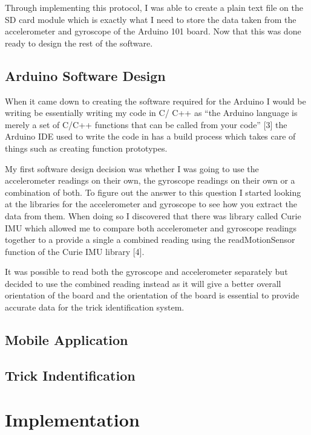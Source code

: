 Through implementing this protocol, I was able to create a plain text file on the SD card module which is exactly what I need to store the data taken from the accelerometer and gyroscope of the Arduino 101 board. Now that this was done ready to design the rest of the software.

\subsection{Arduino Software Design}\label{arduinosoftwaredesign}

When it came down to creating the software required for the Arduino I would be writing be essentially writing my code in C/ C++ as “the Arduino language is merely a set of C/C++ functions that can be called from your code” [3] the Arduino IDE used to write the code in has a build process which takes care of things such as creating function prototypes. 

My first software design decision was whether I was going to use the accelerometer readings on their own, the gyroscope readings on their own or a combination of both. To figure out the answer to this question I started looking at the libraries for the accelerometer and gyroscope to see how you extract the data from them. When doing so I discovered that there was library called Curie IMU which allowed me to compare both accelerometer and gyroscope readings together to a provide a single a combined reading using the readMotionSensor function of the Curie IMU library [4]. 

It was possible to read both the gyroscope and accelerometer separately but decided to use the combined reading instead as it will give a better overall orientation of the board and the orientation of the board is essential to provide accurate data for the trick identification system. 

\subsection{Mobile Application}\label{mobileapp}

\subsection{Trick Indentification}\label{trickidentification}

\section{Implementation}\label{implementation}

